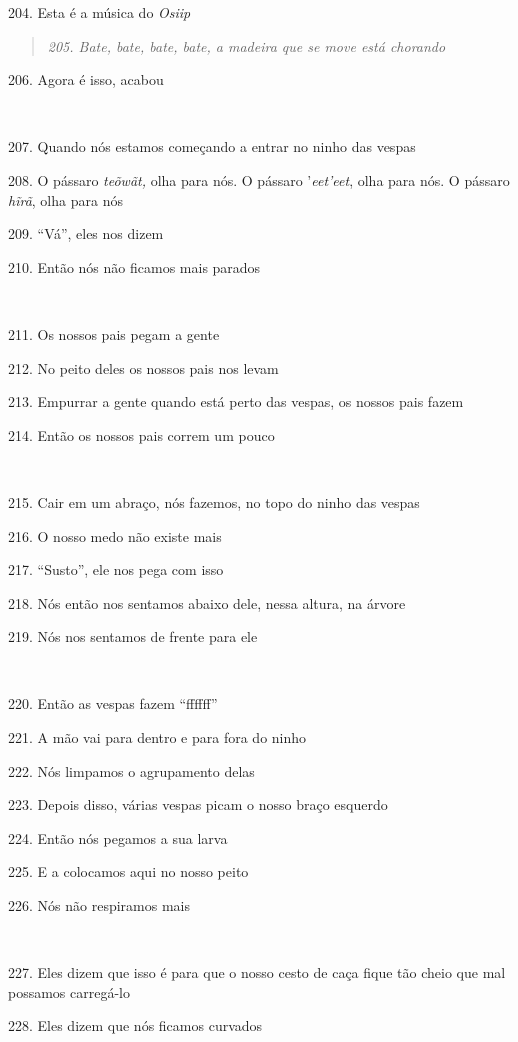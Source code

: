 204. Esta é a música do \emph{Osiip}

\begin{quote}
\forceindent\emph{205. Bate, bate, bate, bate, a madeira que se move está chorando}
\end{quote}

206. Agora é isso, acabou

~

207. Quando nós estamos começando a entrar no ninho das vespas

208. O pássaro \emph{teõwãt,} olha para nós. O pássaro '\emph{eet'eet},
olha para nós. O pássaro \emph{hĩrã}, olha para nós

209. ``Vá'', eles nos dizem

210. Então nós não ficamos mais parados

~

211. Os nossos pais pegam a gente

212. No peito deles os nossos pais nos levam

213. Empurrar a gente quando está perto das vespas, os nossos pais fazem

214. Então os nossos pais correm um pouco

~

215. Cair em um abraço, nós fazemos, no topo do ninho das vespas

216. O nosso medo não existe mais

217. ``Susto'', ele nos pega com isso

218. Nós então nos sentamos abaixo dele, nessa altura, na árvore

219. Nós nos sentamos de frente para ele

~

220. Então as vespas fazem ``ffffff''

221. A mão vai para dentro e para fora do ninho

222. Nós limpamos o agrupamento delas

223. Depois disso, várias vespas picam o nosso braço esquerdo

224. Então nós pegamos a sua larva

225. E a colocamos aqui no nosso peito

226. Nós não respiramos mais

~

227. Eles dizem que isso é para que o nosso cesto de caça fique tão cheio
que mal possamos carregá-lo

228. Eles dizem que nós ficamos curvados

